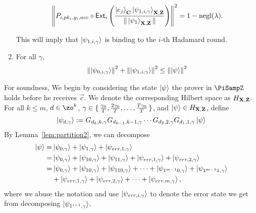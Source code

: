 \begin{lemma}
\begin{enumerate}
			\begin{align}
				\left\lVert P_{i,pk_i,y_i,acc} \circ \mathsf{Ext}_i\left(\frac{\ket{e_j}_{\mathbf{C}}\ket{\psi_{1,i,\gamma}}_{\mathbf{X},\mathbf{Z}}}{\|\ket{\psi_1}_{\mathbf{X},\mathbf{Z}}\|}\right)\right\rVert^2 =1-\operatorname{negl}(\lambda).
			\end{align}

			This will imply that    $\ket{\psi_{1,i,\gamma}}$ is binding to the $i$-th Hadamard round.

		\item \label{property-partition-norm-sum}
			For all $\gamma$,
			\begin{align}
				\left\lVert\ket{\psi_{0,i,\gamma}}\right\rVert^2+ \left\lVert\ket{\psi_{1,i,\gamma}}\right\rVert^2 \leq  \left\lVert\ket{\psi}\right\rVert^2
			\end{align}



	\end{enumerate}
\end{lemma}


For soundness, We begin by considering the state $\ket{\psi}$ the prover in $\PiSampZ$ holds before he receives $\vec{c}$. We denote the corresponding Hilbert space as $H_{\mathbf{X},\mathbf{Z}}$.
For all $k\leq m$, $d\in \zo^k$, $\gamma\in\set{\frac{\gamma_0}{T},\frac{2\gamma_0}{T},\dots,\frac{T\gamma_0}{T}}$, and $\ket{\psi} \in H_{\mathbf{X},\mathbf{Z}}$, define
$$\ket{\psi_{d,\gamma}}:= G_{d_k,k,\gamma}G_{d_{k-1},k-1,\gamma}\cdots G_{d_2,2,\gamma} G_{d_1,1,\gamma} \ket{\psi}$$
By Lemma~\ref{lem:partition2}, we can decompose
\begin{align} \label{eq:partition-string}
	\ket{\psi} =& \ket{\psi_{0,\gamma}}+\ket{\psi_{1,\gamma}}+\ket{\psi_{err,1,\gamma}} \nonumber \\
	=& \ket{\psi_{0,\gamma}}+\ket{\psi_{10,\gamma}}+\ket{\psi_{11,\gamma}}+\ket{\psi_{err,1,\gamma}}+\ket{\psi_{err,2,\gamma}} \nonumber \\
	=& \ket{\psi_{0,\gamma}}+\ket{\psi_{10,\gamma}}+\ket{\psi_{110,\gamma}}+\cdots+\ket{\psi_{1^{m-1}0,\gamma}}+\ket{\psi_{1^{m-1}1,\gamma}} \nonumber \\
	&+\ket{\psi_{err,1,\gamma}}+\ket{\psi_{err,2,\gamma}}+\cdots+\ket{\psi_{err,m,\gamma}},
\end{align}
where we abuse the notation and use $\ket{\psi_{err,i,\gamma}}$ to denote the error state we get from decomposing $\ket{\psi_{1^{i-1},\gamma}}$.

